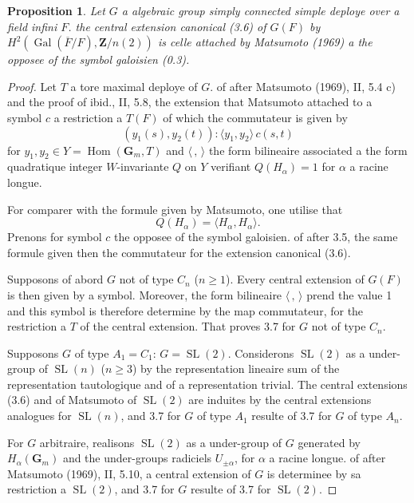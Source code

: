 \documentclass[11pt,a4paper]{article}
\theoremstyle{plain}
\newtheorem{proposition}[theorem]{Proposition}
\theoremstyle{definition}
\DeclareMathOperator{\Gal}{Gal}
\DeclareMathOperator{\Hom}{Hom}
\DeclareMathOperator{\SL}{SL}
\begin{document}
\begin{proposition}\label{3.7}
Let $G$ a algebraic group simply connected simple deploye over a field infini $F$. the central extension canonical (3.6) of $G(F)$ by $H^2(\Gal(\overline{F}/F), \mathbf{Z}/n(2))$ is celle attached by Matsumoto (1969) a the opposee of the symbol galoisien (0.3).
\end{proposition}

\begin{proof}
Let $T$ a tore maximal deploye of $G$. of after Matsumoto (1969), II, 5.4 c) and the proof of ibid., II, 5.8, the extension that Matsumoto attached to a symbol $c$ a restriction a $T(F)$ of which the commutateur is given by
\begin{equation}\label{3.7.1}
(y_1(s), y_2(t)) : \langle y_1, y_2 \rangle \, c(s, t)
\end{equation}
for $y_1, y_2 \in Y = \Hom(\mathbf{G}_m, T)$ and $\langle \, , \, \rangle$ the form bilineaire associated a the form quadratique integer $W$-invariante $Q$ on $Y$ verifiant $Q(H_\alpha) = 1$ for $\alpha$ a racine longue.

For comparer with the formule given by Matsumoto, one utilise that
\[
Q(H_\alpha) = \langle H_\alpha, H_\alpha \rangle.
\]
Prenons for symbol $c$ the opposee of the symbol galoisien. of after 3.5, the same formule given then the commutateur for the extension canonical (3.6).

Supposons of abord $G$ not of type $C_n$ ($n \geq 1$). Every central extension of $G(F)$ is then given by a symbol. Moreover, the form bilineaire $\langle \, , \, \rangle$ prend the value 1 and this symbol is therefore determine by the map commutateur, for the restriction a $T$ of the central extension. That proves 3.7 for $G$ not of type $C_n$.

Supposons $G$ of type $A_1 = C_1$: $G = \SL(2)$. Considerons $\SL(2)$ as a under-group of $\SL(n)$ ($n \geq 3$) by the representation lineaire sum of the representation tautologique and of a representation trivial. The central extensions (3.6) and of Matsumoto of $\SL(2)$ are induites by the central extensions analogues for $\SL(n)$, and 3.7 for $G$ of type $A_1$ resulte of 3.7 for $G$ of type $A_n$.

For $G$ arbitraire, realisons $\SL(2)$ as a under-group of $G$ generated by $H_\alpha(\mathbf{G}_m)$ and the under-groups radiciels $U_{\pm\alpha}$, for $\alpha$ a racine longue. of after Matsumoto (1969), II, 5.10, a central extension of $G$ is determinee by sa restriction a $\SL(2)$, and 3.7 for $G$ resulte of 3.7 for $\SL(2)$.
\end{proof}
\end{document}
